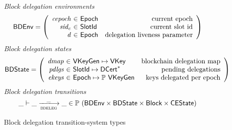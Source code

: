 \begin{figure}
  \emph{Block delegation environments}
  \begin{equation*}
    \BDEnv =
    \left(
      \begin{array}{r@{~\in~}lr}
        \var{cepoch} & \Epoch & \text{current epoch}\\
        \var{sid_c} & \SlotId & \text{current slot id}\\
        \var{d} & \Epoch & \text{delegation liveness parameter}\\
      \end{array}
    \right)
  \end{equation*}
  \emph{Block delegation states}
  \begin{equation*}
    \BDState =
    \left(
      \begin{array}{r@{~\in~}lr}
        \var{dmap} & \VKeyGen \mapsto \VKey & \text{blockchain delegation map}\\
        \var{pdlgs} & \SlotId \mapsto \seqof{\DCert} & \text{pending delegations}\\
        \var{ekeys} & \Epoch \mapsto \powerset{\VKeyGen} & \text{keys delegated per epoch}
      \end{array}
    \right)
  \end{equation*}
  \emph{Block delegation transitions}
  \begin{equation*}
    \_ \vdash \_ \trans{bdeleg}{\_} \_ \in
      \powerset (\BDEnv \times \BDState \times \Block \times \CEState)
  \end{equation*}
  \caption{Block delegation transition-system types}
  \label{fig:ts-types:block-delegation}
\end{figure}

